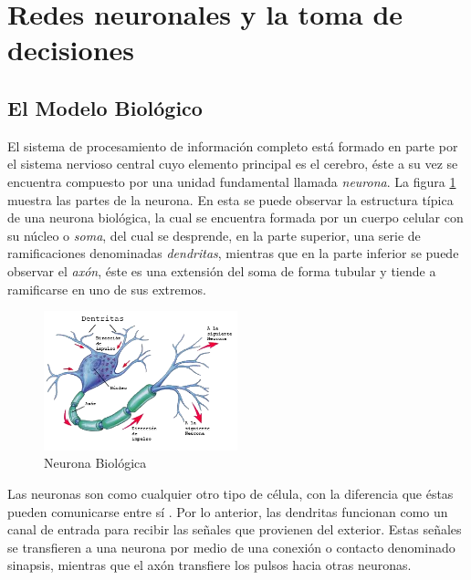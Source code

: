 \section{Redes neuronales y la toma de decisiones}
\subsection{El Modelo Biol\'{o}gico}
 
 		El sistema de procesamiento de informaci\'{o}n completo est\'{a} formado en
 		parte por el sistema nervioso central cuyo elemento principal es el cerebro,
 		\'{e}ste a su vez se encuentra compuesto por una unidad fundamental llamada \textit{neurona}.
 	\cite{Kriesel2005} La figura \ref{fig:neuronaBio} muestra las partes de la
 	neurona. En esta se puede observar la estructura t\'{i}pica de una neurona biol\'{o}gica, la
 	cual se encuentra formada por un cuerpo celular con su n\'{u}cleo o
 	\textit{soma}, del cual se desprende, en la parte superior, una serie de
 	ramificaciones denominadas \textit{dendritas}, mientras que en la parte
 	inferior se puede observar el \textit{ax\'{o}n}, \'{e}ste es una extensi\'{o}n del soma de forma tubular y
 	tiende a ramificarse en uno de sus extremos.
 	
 	\begin{figure}[htp]
 		\centering
 		\includegraphics[width=0.5\textwidth]{images/TesisYGR-neuron.png}
 		\caption{Neurona Biol\'{o}gica}
 		\label{fig:neuronaBio}
 	\end{figure}
 	
 	 		Las neuronas son como cualquier otro tipo de c\'{e}lula, con la diferencia que
 	\'{e}stas pueden comunicarse entre s\'{i} \cite{Longo2011}. Por lo anterior, las dendritas
 	funcionan como un canal de entrada para recibir las se\~{n}ales que provienen del
 	exterior. Estas se\~{n}ales se transfieren a una neurona por medio de una conexi\'{o}n o contacto denominado sinapsis, mientras que el ax\'{o}n transfiere los pulsos hacia otras neuronas.

